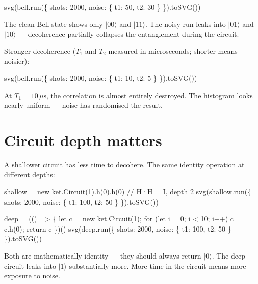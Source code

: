\documentclass[
  11pt,
  letterpaper,
  oneside]{scrbook}
\newenvironment{Shaded}{\begin{snugshade}}{\end{snugshade}}
\newcommand{\NormalTok}[1]{\textcolor[rgb]{0.00,0.23,0.31}{#1}}
\begin{document}
\begin{Shaded}
\begin{Highlighting}[]
\NormalTok{svg(bell.run(\{ shots: 2000, noise: \{ t1: 50, t2: 30 \} \}).toSVG())}
\end{Highlighting}
\end{Shaded}

The clean Bell state shows only \(|00\rangle\) and \(|11\rangle\). The
noisy run leaks into \(|01\rangle\) and \(|10\rangle\) --- decoherence
partially collapses the entanglement during the circuit.

Stronger decoherence (\(T_1\) and \(T_2\) measured in microseconds;
shorter means noisier):

\begin{Shaded}
\begin{Highlighting}[]
\NormalTok{svg(bell.run(\{ shots: 2000, noise: \{ t1: 10, t2: 5 \} \}).toSVG())}
\end{Highlighting}
\end{Shaded}

At \(T_1 = 10\,\mu\text{s}\), the correlation is almost entirely
destroyed. The histogram looks nearly uniform --- noise has randomised
the result.

\section{Circuit depth matters}\label{circuit-depth-matters}

A shallower circuit has less time to decohere. The same identity
operation at different depths:

\begin{Shaded}
\begin{Highlighting}[]
\NormalTok{shallow = new ket.Circuit(1).h(0).h(0)   // H·H = I, depth 2}
\NormalTok{svg(shallow.run(\{ shots: 2000, noise: \{ t1: 100, t2: 50 \} \}).toSVG())}
\end{Highlighting}
\end{Shaded}

\begin{Shaded}
\begin{Highlighting}[]
\NormalTok{deep = (() =\textgreater{} \{ let c = new ket.Circuit(1); for (let i = 0; i \textless{} 10; i++) c = c.h(0); return c \})()}
\NormalTok{svg(deep.run(\{ shots: 2000, noise: \{ t1: 100, t2: 50 \} \}).toSVG())}
\end{Highlighting}
\end{Shaded}

Both are mathematically identity --- they should always return
\(|0\rangle\). The deep circuit leaks into \(|1\rangle\) substantially
more. More time in the circuit means more exposure to noise.
\end{document}
